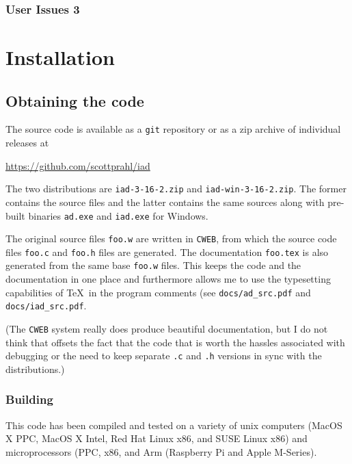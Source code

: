 \documentclass{article}
\begin{document}
\subsubsection*{User Issues 3}

\clearpage
\section{Installation}

\subsection{Obtaining the code}

The source code is available as a \texttt{git} repository or as a zip archive
of individual releases at

\begin{center}
\url{https://github.com/scottprahl/iad}
\end{center}

The two distributions are \texttt{iad-3-16-2.zip} and \texttt{iad-win-3-16-2.zip}.
The former contains the source files and the latter contains the same sources along 
with pre-built binaries \texttt{ad.exe} and \texttt{iad.exe} for Windows.  

The original source files \texttt{foo.w} are written in \texttt{CWEB}, from which the
source code files \texttt{foo.c} and \texttt{foo.h} files are 
generated.  The documentation \texttt{foo.tex} is also generated from the same
base \texttt{foo.w} files.  This keeps the code and the documentation in one
place and furthermore allows me to use the typesetting  capabilities of \TeX\ in
the program comments (see \texttt{docs/ad\_src.pdf} and \texttt{docs/iad\_src.pdf}.

(The \texttt{CWEB} system really does produce beautiful documentation, but I do not 
think that offsets the fact that the code that is worth the hassles associated
with debugging or the need to keep separate \texttt{.c} and \texttt{.h} versions
in sync with the distributions.)

\subsubsection{Building}

This code has been compiled and tested on a variety of unix computers (MacOS X PPC, MacOS X Intel,
Red Hat Linux x86, and SUSE Linux x86) and microprocessors (PPC, x86, and Arm (Raspberry Pi and
Apple M-Series).
\end{document}
